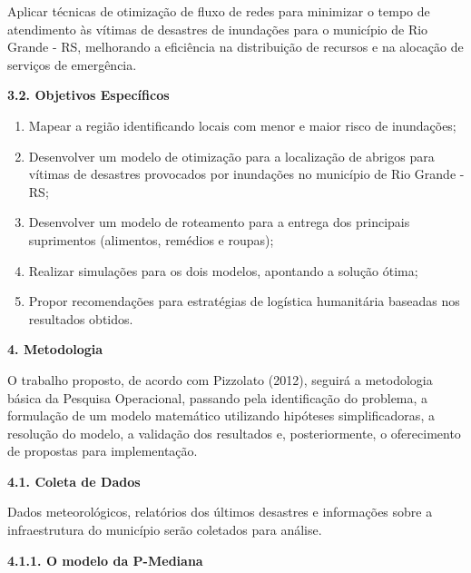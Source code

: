 \documentclass[
]{article}
\begin{document}
Aplicar técnicas de otimização de fluxo de redes para minimizar o tempo
de atendimento às vítimas de desastres de inundações para o município de
Rio Grande - RS, melhorando a eficiência na distribuição de recursos e
na alocação de serviços de emergência.

\textbf{3.2. Objetivos Específicos}

\begin{enumerate}
\def\labelenumi{\arabic{enumi}.}
\item
  Mapear a região identificando locais com menor e maior risco de
  inundações;
\item
  Desenvolver um modelo de otimização para a localização de abrigos para
  vítimas de desastres provocados por inundações no município de Rio
  Grande - RS;
\item
  Desenvolver um modelo de roteamento para a entrega dos principais
  suprimentos (alimentos, remédios e roupas);
\item
  Realizar simulações para os dois modelos, apontando a solução ótima;
\item
  Propor recomendações para estratégias de logística humanitária
  baseadas nos resultados obtidos.
\end{enumerate}

\textbf{4. Metodologia}

O trabalho proposto, de acordo com Pizzolato (2012), seguirá a
metodologia básica da Pesquisa Operacional, passando pela identificação
do problema, a formulação de um modelo matemático utilizando hipóteses
simplificadoras, a resolução do modelo, a validação dos resultados e,
posteriormente, o oferecimento de propostas para implementação.

\textbf{4.1. Coleta de Dados}

Dados meteorológicos, relatórios dos últimos desastres e informações
sobre a infraestrutura do município serão coletados para análise.

\textbf{4.1.1. O modelo da P-Mediana}
\end{document}
